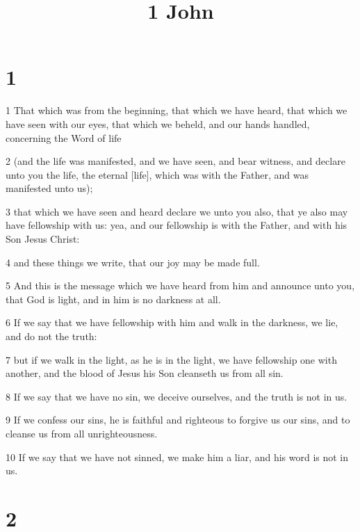 

\title{1 John}

\chapter{1}

\par 1 That which was from the beginning, that which we have heard, that which we have seen with our eyes, that which we beheld, and our hands handled, concerning the Word of life
\par 2 (and the life was manifested, and we have seen, and bear witness, and declare unto you the life, the eternal [life], which was with the Father, and was manifested unto us);
\par 3 that which we have seen and heard declare we unto you also, that ye also may have fellowship with us: yea, and our fellowship is with the Father, and with his Son Jesus Christ:
\par 4 and these things we write, that our joy may be made full.
\par 5 And this is the message which we have heard from him and announce unto you, that God is light, and in him is no darkness at all.
\par 6 If we say that we have fellowship with him and walk in the darkness, we lie, and do not the truth:
\par 7 but if we walk in the light, as he is in the light, we have fellowship one with another, and the blood of Jesus his Son cleanseth us from all sin.
\par 8 If we say that we have no sin, we deceive ourselves, and the truth is not in us.
\par 9 If we confess our sins, he is faithful and righteous to forgive us our sins, and to cleanse us from all unrighteousness.
\par 10 If we say that we have not sinned, we make him a liar, and his word is not in us.

\chapter{2}

